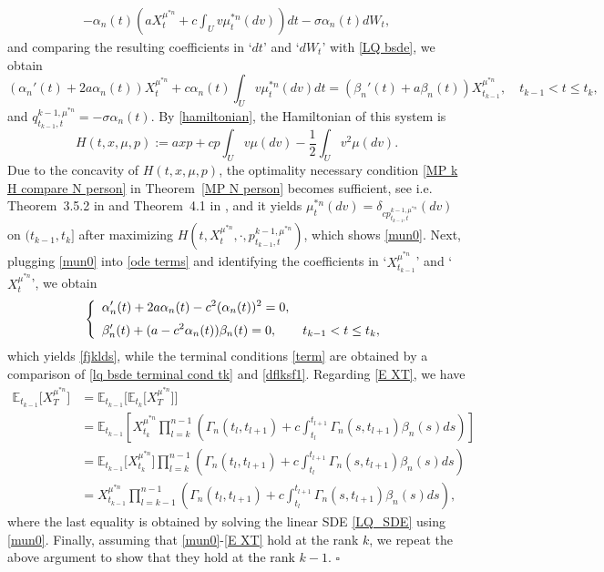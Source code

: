\documentclass[12pt]{article}
\theoremstyle{named}
\numberwithin{equation}{section}
\newenvironment{Proof}{\removelastskip\par\medskip \noindent{\em Proof.} \rm}{\penalty-20\null\hfill$\square$\par\medbreak}
\newcommand{\E}{\mathbb{E}}
\let\oldcitet=\citet
\renewcommand{\cite}[1]{\textcolor[rgb]{0,0,1}{\oldcitet{#1}}}
\renewcommand{\citet}[1]{\textcolor[rgb]{0,0,1}{\oldcitet{#1}}}
\begin{document}
\begin{Proof}
\begin{eqnarray*}
 - \alpha_n (t)
 \left( aX^{\mu^{*n}}_t + c \int_U v \mu^{*n}_t(dv)\right) dt
  -  \sigma \alpha_n (t)
dW_t,
 \end{eqnarray*}
 and comparing the resulting coefficients in `$dt$' and `$dW_t$' with \eqref{LQ bsde}, we obtain
\begin{equation}\label{ode terms}
  (\alpha_n' (t) + 2a\alpha_n (t) )X^{\mu^{*n} }_{t}
  + c \alpha_n (t) \int_U v \mu^{*n}_t(dv) dt
 = (\beta_n' (t) + a\beta_n (t) )X^{\mu^{*n} }_{t_{k-1}},
 \quad t_{k-1} < t \leq t_k,
\end{equation}
and $q^{k-1,\mu^{*n} }_{t_{k-1},t} = -\sigma\alpha_n (t)$.
 By \eqref{hamiltonian}, the Hamiltonian of this system is
\[
H(t, x, \mu, p) := axp + c p \int_U v \mu(dv) - \frac{1}{2} \int_U v^2 \mu(dv).
\]
Due to the concavity of $H(t, x, \mu, p)$,
the optimality necessary condition \eqref{MP k H compare N person} in
Theorem~\ref{MP N person} becomes sufficient,
see i.e. Theorem~3.5.2 in \cite{yong1999stochastic}
and Theorem~4.1 in \cite{andersson2011},
and it yields
$\mu^{*n} _t (dv) = \delta_{c p^{k-1,\mu^{*n} }_{t_{k-1},t}} (dv)$
 on $(t_{k-1}, t_k]$ after maximizing
      $H(t, X^{\mu^{*n}}_t, \cdot , p^{k-1,\mu^{*n} }_{t_{k-1},t} )$,
      which shows \eqref{mun0}.
      Next, plugging \eqref{mun0} into \eqref{ode terms}
      and identifying the coefficients in `$X^{\mu^{*n} }_{t_{k-1}}$' and `$X^{\mu^{*n} }_{t}$', we obtain
\[
\left\{
  \begin{array}{l}
    \displaystyle
    \alpha_n' (t) + 2a\alpha_n (t) - c^2(\alpha_n (t))^2 = 0,
\medskip
 \\
    \displaystyle
    \beta_n' (t) + (a - c^2\alpha_n (t) )\beta_n (t) = 0,
    \qquad
    t_{k-1} < t \leq t_k,
  \end{array}
  \right.
\]
which yields \eqref{fjklds}, while the terminal conditions \eqref{term}
are obtained by a comparison of \eqref{lq bsde terminal cond tk} and \eqref{dflksf1}.
Regarding \eqref{E XT}, we have
\begin{align*}
  \E_{t_{k-1}} \big[ X^{\mu^{*n} }_T \big] & =
  \E_{t_{k-1}} \big[ \E_{t_k} \big[ X^{\mu^{*n} }_T \big] \big]
  \\
  & =
  \E_{t_{k-1}} \left[X^{\mu^{*n} }_{t_k} \prod\limits_{l=k}^{n-1}\left( \Gamma_n (t_l, t_{l+1}) + c \int_{t_l}^{t_{l+1}} \Gamma_n (s, t_{l+1})\beta_n(s) ds \right)\right]
   \\
  & =
   \E_{t_{k-1}} \big[X^{\mu^{*n} }_{t_k} \big]
   \prod\limits_{l=k}^{n-1}\left( \Gamma_n (t_l, t_{l+1}) + c \int_{t_l}^{t_{l+1}} \Gamma_n (s, t_{l+1})\beta_n(s) ds \right)
   \\
                                                & = X^{\mu^{*n} }_{t_{k-1}} \prod\limits_{l=k-1}^{n-1}\left( \Gamma_n (t_l, t_{l+1}) + c \int_{t_l}^{t_{l+1}} \Gamma_n (s, t_{l+1})\beta_n(s) ds \right),
\end{align*}
where the last equality is obtained by solving the linear SDE \eqref{LQ_SDE}
using \eqref{mun0}.
 Finally, assuming that \eqref{mun0}-\eqref{E XT} hold at the rank $k$,
 we repeat the above argument to show that they hold at the rank $k-1$.
\end{Proof}
\end{document}
